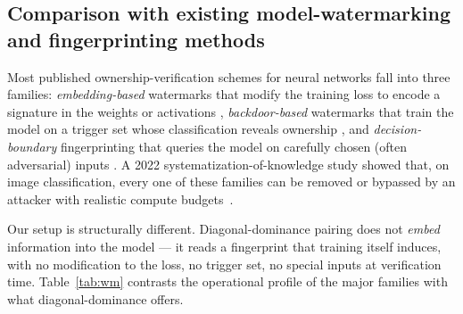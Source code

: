 \documentclass[10pt]{article}
\theoremstyle{remark}
\begin{document}
\subsection{Comparison with existing model-watermarking and
fingerprinting methods}\label{sec:watermark-compare}

Most published ownership-verification schemes for neural networks fall
into three families: \emph{embedding-based} watermarks that modify the
training loss to encode a signature in the weights or activations
\cite{uchida2017embedding,rouhani2019deepsigns,chen2019deepmarks},
\emph{backdoor-based} watermarks that train the model on a trigger set
whose classification reveals ownership
\cite{adi2018turning,zhang2018protecting}, and
\emph{decision-boundary} fingerprinting that queries the model on
carefully chosen (often adversarial) inputs
\cite{lemerrer2020adversarial,cao2021ipguard,he2019sensitive}. A 2022
systematization-of-knowledge study showed that, on image
classification, every one of these families can be removed or bypassed
by an attacker with realistic compute budgets~\cite{lukas2022deep}.

Our setup is structurally different. Diagonal-dominance pairing does
not \emph{embed} information into the model --- it reads a fingerprint
that training itself induces, with no modification to the loss, no
trigger set, no special inputs at verification time. Table~\ref{tab:wm}
contrasts the operational profile of the major families with what
diagonal-dominance offers.
\end{document}
